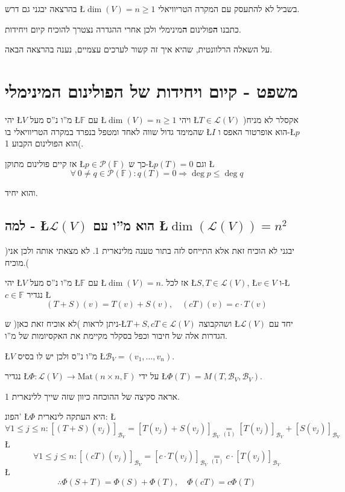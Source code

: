 \documentclass[english,hebrew]{article}
\begin{document}
בהרצאה יבגני גם דרש \L{$\dim(V)=n\ge1$} בשביל לא להתעסק עם המקרה
הטריוויאלי.

כתבנו \textbf{ה}פולינום \textbf{ה}מינימלי ולכן אחרי ההגדרה נצטרך להוכיח
קיום ויחידות.

על השאלה הרלוונטית, שהיא איך זה קשור לערכים עצמיים, נענה בהרצאה הבאה.

\section{משפט - קיום ויחידות של הפולינום המינימלי}

יהי \L{$V$} מ\textquotedblright ו נ\textquotedblright ס מעל \L{$\mathbb{F}$}
עם \L{$\dim(V)=n\ge1$} ויהי \L{$T\in\mathcal{L}(V)$} )אקסלר לא מניח
שהמימד גדול שווה לאחד ומטפל בנפרד במקרה הטריוויאלי בו \L{$I$} הוא
אופרטור האפס ו-\L{$p$} הוא הפולינום הקבוע 1(.

אז קיים פולינום מתוקן \L{$p\in\mathcal{P}(\mathbb{F})$} כך ש-\L{$p(T)=0$}
וגם \L{%
\[
\forall\ 0\ne q\in\mathcal{P}(\mathbb{F}):q(T)=0\Rightarrow\deg p\le\deg q
\]
}%

והוא יחיד.

\subsection{למה - \L{$\mathcal{L}\left(V\right)$} הוא מ\textquotedblright ו
עם \L{$\dim\left(\mathcal{L}\left(V\right)\right)=n^{2}$}}

)יבגני לא הוכיח זאת אלא התייחס לזה בתור טענה מלינארית 1. לא מצאתי
אותה ולכן אני מוכיח.(

יהי \L{$V$} מ\textquotedblright ו נ\textquotedblright ס מעל \L{$\mathbb{F}$}
עם \L{$\dim(V)=n$}. אז לכל \L{$S,T\in\mathcal{L}(V)$}, \L{$v\in V$}
ו-\L{$c\in\mathbb{F}$} נגדיר \L{%
\[
\left(T+S\right)(v)=T(v)+S(v),\quad\left(cT\right)(v)=c\cdot T(v)
\]
}%

ניתן לראות )לא אוכיח זאת כאן( ש-\L{$T+S,cT\in\mathcal{L}(V)$} ושהקבוצה
\L{$\mathcal{L}(V)$} יחד עם הגדרות אלה של חיבור וכפל בסקלר מקיימת
את האקסיומות של מ\textquotedblright ו.

\L{$V$} מ\textquotedblright ו נ\textquotedblright ס ולכן יש לו בסיס
\L{$\mathcal{B}_{V}=\left(v_{1},\dots,v_{n}\right)$}.

נגדיר \L{$\Phi:\mathcal{L}(V)\rightarrow\text{Mat}\left(n\times n,\mathbb{F}\right)$}
על ידי \L{$\Phi(T)=M\left(T,\mathcal{B}_{V},\mathcal{B}_{V}\right)$}.

אראה סקיצה של ההוכחה כיוון שזה שייך ללינארית 1.

הפונ' \L{$\Phi$} היא העתקה לינארית: \L{%
\[
\forall1\le j\le n:\left[\left(T+S\right)\left(v_{j}\right)\right]_{\mathcal{B}_{V}}=\left[T\left(v_{j}\right)+S\left(v_{j}\right)\right]_{\mathcal{B}_{V}}\underset{(1)}{=}\left[T\left(v_{j}\right)\right]_{\mathcal{B}_{V}}+\left[S\left(v_{j}\right)\right]_{\mathcal{B}_{V}}
\]
}%
\L{%
\[
\forall1\le j\le n:\left[\left(cT\right)\left(v_{j}\right)\right]_{\mathcal{B}_{V}}=\left[c\cdot T\left(v_{j}\right)\right]_{\mathcal{B}_{V}}\underset{(1)}{=}c\cdot\left[T\left(v_{j}\right)\right]_{\mathcal{B}_{V}}
\]
}%
\L{%
\[
\therefore\Phi(S+T)=\Phi(S)+\Phi(T),\quad\Phi(cT)=c\Phi(T)
\]
}%
\end{document}
